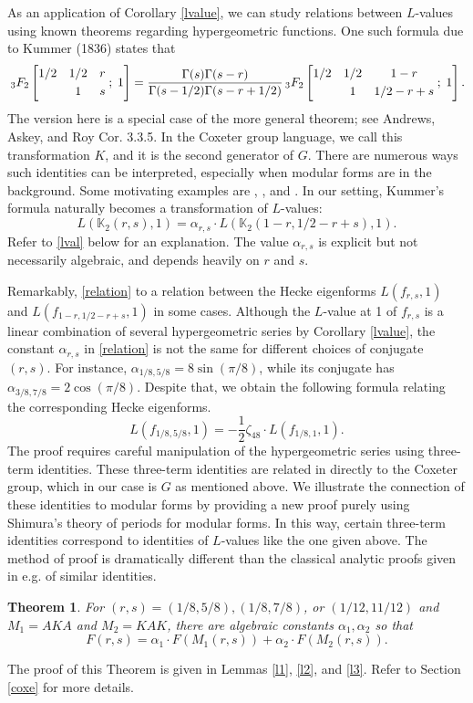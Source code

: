 \documentclass[12pt]{amsart}
\newtheorem{theorem}{Theorem}[section]
\theoremstyle{definition}
\theoremstyle{remark}
\newcommand*\HYPERskip{&}
\newcommand*\pfq{
\begingroup
\catcode`\,\active
\def ,{\HYPERskip}
\doHyper
}
\def\doHyper#1#2#3#4#5{
\, _{#1}F_{#2}\left[\begin{matrix}#3 \smallskip \\  #4\end{matrix} \; ; \; #5\right]
\endgroup
}
\begin{document}
As an application of Corollary \ref{lvalue}, we can study relations between $L$-values using known theorems regarding hypergeometric functions. One such formula due to Kummer (1836) states that 
   \begin{equation}\label{kummer}
       \pfq{3}{2}{1/2,1/2,r}{,1,s}{1}=\frac{\Gamma(s)\Gamma(s-r)}{\Gamma(s-1/2)\Gamma(s-r+1/2)}\pfq{3}{2}{1/2,1/2,1-r}{,1,1/2-r+s}{1}.
   \end{equation} 
The version here is a special case of the more general theorem; see Andrews, Askey, and Roy \cite{aar} Cor. 3.3.5. In the Coxeter group language, we call this transformation $K$, and it is the second generator of $G$. There are numerous ways such identities can be interpreted, especially when modular forms are in the background. Some motivating examples are \cite{chenchu}, \cite{whipple},  and \cite{zudilin2}. 
In our setting, Kummer's formula naturally  becomes a transformation of $L$-values: \begin{equation}\label{relation}
L(\mathbb{K}_2(r,s),1)=\alpha_{r,s}\cdot L(\mathbb{K}_2(1-r,1/2-r+s),1).
\end{equation} Refer to \eqref{lval} below for an explanation. The value $\alpha_{r,s}$ is  explicit but not necessarily algebraic, and depends heavily on $r$ and $s$.

Remarkably, \eqref{relation}  to a relation between the Hecke eigenforms $L(f_{r,s},1)$ and $L(f_{1-r,1/2-r+s},1)$ in some cases. Although the $L$-value at 1 of $f_{r,s}$ is a linear combination of several hypergeometric series by Corollary \ref{lvalue}, the constant $\alpha_{r,s}$ in \eqref{relation} is not the same for different choices of conjugate $(r,s)$. For instance, $\alpha_{1/8,5/8}=8\sin(\pi/8)$, while its conjugate has $\alpha_{3/8,7/8}=2\cos(\pi/8)$. Despite that, we obtain the following formula relating the corresponding Hecke eigenforms.
\begin{equation}\label{L2} 
    L(f_{1/8,5/8},1)=-\frac{1}{2}\zeta_{48}\cdot L(f_{1/8,1},1).
\end{equation}
The proof requires careful manipulation of the hypergeometric series using three-term identities. These three-term identities are related in \cite{coxeter} directly to the Coxeter group, which in our case is $G$ as mentioned above. We illustrate the connection of these identities to modular forms by providing a new proof purely using Shimura's theory of periods for modular forms. In this way, certain three-term identities correspond to identities of $L$-values like the one given above. The method of proof is dramatically different than the classical analytic proofs given in e.g. \cite{thomae} of similar identities. \begin{theorem}\label{mainpar}
   For $(r,s)=(1/8,5/8),(1/8,7/8)$, or $(1/12,11/12)$ and $M_1=AKA$ and $M_2=KAK$, there are algebraic constants $\alpha_1,\alpha_2$ so that \begin{equation}\label{eq:3-term}
        F(r,s)=\alpha_1 \cdot F(M_1(r,s))+\alpha_2\cdot F(M_2(r,s)).
    \end{equation}
\end{theorem}
\noindent The proof of this Theorem is given in Lemmas \ref{l1}, \ref{l2}, and \ref{l3}.  Refer to Section \ref{coxe} for more details.
\end{document}
